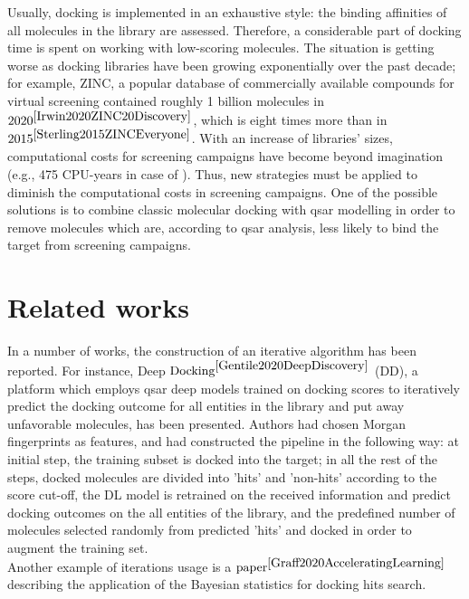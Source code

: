 Usually, docking is implemented in an exhaustive style: the binding affinities of all molecules in the library are assessed.
Therefore, a considerable part of docking time is spent on working with low-scoring molecules.
The situation is getting worse as docking libraries have been growing exponentially over the past decade; for example, ZINC, a popular database of commercially available compounds for virtual screening contained roughly 1 billion molecules in $2020^{\cite{Irwin2020ZINC20Discovery}}$, which is eight times more than in $2015^{\cite{Sterling2015ZINCEveryone}}$.
With an increase of libraries' sizes, computational costs for screening campaigns have become beyond imagination (e.g.,  475 CPU-years in case of \cite{Gorgulla2020AnScreens}).
Thus, new strategies must be applied to diminish the computational costs in screening campaigns.
One of the possible solutions is to combine classic molecular docking with \acrshort{qsar} modelling in order to remove molecules which are, according to \acrshort{qsar} analysis, less likely to bind the target from screening campaigns.\\

\section{Related works}
 
In a number of works, the construction of an iterative algorithm has been reported.
For instance, Deep $\text{Docking}^{\cite{Gentile2020DeepDiscovery}}$ (DD), a platform which employs \acrshort{qsar} deep models trained on docking scores to iteratively predict the docking outcome for all entities in the library and put away unfavorable molecules, has been presented.
Authors had chosen Morgan fingerprints as features, and had constructed the pipeline in the following way: at initial step, the training subset is docked into the target; in all the rest of the steps, docked molecules are divided into 'hits' and 'non-hits' according to the score cut-off, the DL model is retrained on the received information and predict docking outcomes on the all entities of the library, and the predefined number of molecules selected randomly from predicted 'hits' and docked in order to augment the training set.\\

Another example of iterations usage is a $\text{paper}^{\cite{Graff2020AcceleratingLearning}}$ describing the application of the Bayesian statistics for docking hits search. \\

